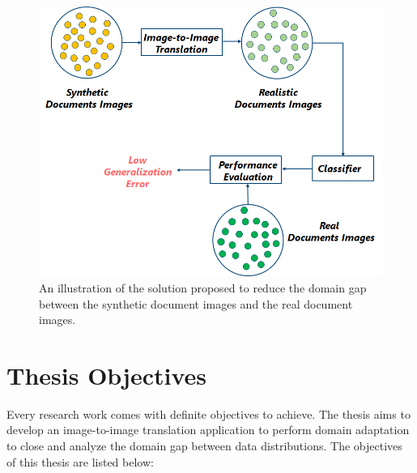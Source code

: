 \begin{figure}[H]
        \begin{center}
	    \includegraphics[scale=0.55]{images/Introduction/ProposedSolution.png}
	    \caption[An illustration of the solution proposed to reduce the domain gap between the synthetic document images and the real document images.]{An illustration of the solution proposed to reduce the domain gap between the synthetic document images and the real document images.}
	    \label{fig:ProposedSolution}
	    \end{center}
\end{figure}

\newpage

\section{Thesis Objectives}\label{thesisobjectives}
Every research work comes with definite objectives to achieve. The thesis aims to develop an image-to-image translation application to perform domain adaptation to close and analyze the domain gap between data distributions. The objectives of this thesis are listed below:

